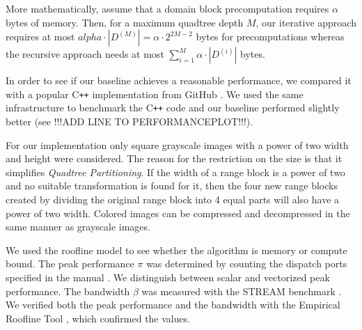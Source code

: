 More mathematically, assume that a domain block precomputation requires $\alpha$ bytes of memory.
Then, for a maximum quadtree depth $M$, our iterative approach requires at most 
$alpha \cdot |D^{(M)}| = \alpha \cdot 2^{2M-2}$ bytes for precomputations 
whereas the recursive approach needs at most $\sum_{i=1}^M \alpha \cdot |D^{(i)}|$ bytes.


In order to see if our baseline achieves a reasonable performance, we compared it with
a popular C\texttt{++} implementation from GitHub \cite{github-cpp}. We used the same infrastructure to benchmark
the C\texttt{++} code and our baseline performed slightly better (see !!!ADD LINE TO PERFORMANCEPLOT!!!).

 For our implementation only square grayscale images with a power
of two width and height were considered. The reason for the restriction on the
size is that it simplifies \textit{Quadtree Partitioning}. If the width of a
range block is a power of two and no suitable transformation is found for it,
then the four new range blocks created by dividing the original range block into
4 equal parts will also have a power of two width. Colored images can be
compressed and decompressed in the same manner as grayscale images.


 We used the roofline model \cite{applying-roofline} to see whether the algorithm is memory or
compute bound. The peak performance $\pi$ was determined by counting the dispatch
ports specified in the manual \cite{intel-opt-manual}. We distinguish between scalar and vectorized peak
performance. The bandwidth $\beta$ was measured with the STREAM benchmark \cite{stream}. We verified both the peak
performance and the bandwidth with the Empirical Roofline Tool \cite{ert}, which confirmed the values.

